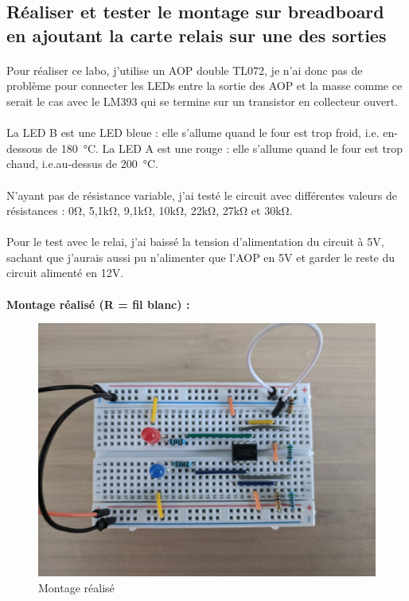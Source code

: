 \documentclass{article}
\begin{document}
\subsection{Réaliser et tester le montage sur breadboard en ajoutant la carte relais sur une des sorties}
\paragraph{}
Pour réaliser ce labo, j'utilise un AOP double TL072, je n'ai donc pas de problème pour connecter les LEDs entre la sortie des AOP et la masse comme ce serait le cas avec le LM393 qui se termine sur un transistor en collecteur ouvert.

\paragraph{}
La LED B est une LED bleue : elle s'allume quand le four est trop froid, i.e. en-dessous de \SI{180}{\celsius}. La LED A est une rouge : elle s'allume quand le four est trop chaud, i.e.au-dessus de \SI{200}{\celsius}.

\paragraph{}
N'ayant pas de résistance variable, j'ai testé le circuit avec différentes valeurs de résistances : 0\si{\ohm}, 5,1\si{\kilo\ohm}, 9,1\si{\kilo\ohm}, 10\si{\kilo\ohm}, 22\si{\kilo\ohm}, 27\si{\kilo\ohm} et 30\si{\kilo\ohm}.

\paragraph{}
Pour le test avec le relai, j'ai baissé la tension d'alimentation du circuit à 5V, sachant que j'aurais aussi pu n'alimenter que l'AOP en 5V et garder le reste du circuit alimenté en 12V.

\setcounter{figure}{1}
\paragraph{}
\textbf{Montage réalisé (R = fil blanc) :}
\begin{figure}[H]
    \centering
    \includegraphics[width=.6\linewidth]{./images/labo4-montage.jpg}
    \caption{Montage réalisé}
\end{figure}
\end{document}
